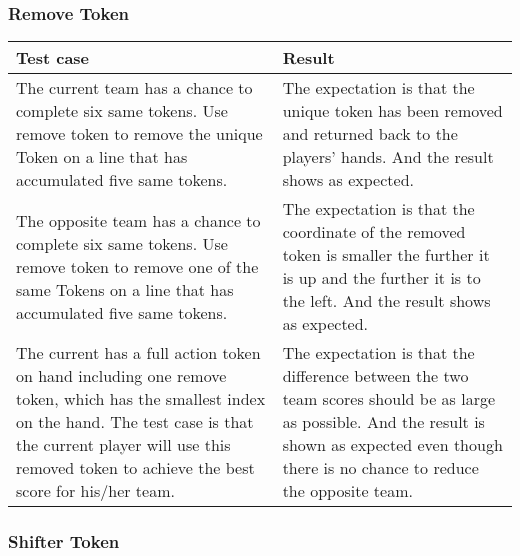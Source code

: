 \newpage
\subsubsection{Remove Token}	

\begin{table}[h]
	\centering
	\begin{tabular}{p{7cm}@{\hskip 5mm}  p{7cm}} 
		\toprule
		Test case   & Result   \\ 
		\midrule
		\midrule
		The current team has a chance to complete six same tokens. Use remove token to remove the unique Token on a line that has accumulated five same tokens.  & The expectation is that the unique token has been removed and returned back to the players' hands. And the result shows as expected. \\
		\midrule
	    The opposite team has a chance to complete six same tokens. Use remove token to remove one of the same Tokens on a line that has accumulated five same tokens. & The expectation is that the coordinate of the removed token is smaller the further it is up and the further it is to the left. And the result shows as expected.  \\
		\midrule
	    The current has a full action token on hand including one remove token, which has the smallest index on the hand. The test case is that the current player will use this removed token to achieve the best score for his/her team. & The expectation is that the difference between the two team scores should be as large as possible. And the result is shown as expected even though there is no chance to reduce the opposite team.     \\
		\bottomrule
	\end{tabular}
\end{table}

\newpage
\subsubsection{Shifter Token}

